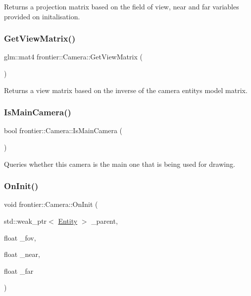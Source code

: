 Returns a projection matrix based on the field of view, near and far variables provided on initalisation. 

\mbox{\label{classfrontier_1_1_camera_ad31e39125db73f05bfb9aabbf221c8e3}} 
\subsubsection{\texorpdfstring{Get\+View\+Matrix()}{GetViewMatrix()}}
{\footnotesize\ttfamily glm\+::mat4 frontier\+::\+Camera\+::\+Get\+View\+Matrix (\begin{DoxyParamCaption}{ }\end{DoxyParamCaption})}



Returns a view matrix based on the inverse of the camera entity\textquotesingle{}s model matrix. 

\mbox{\label{classfrontier_1_1_camera_abccd21681649a9474ac1708522a4b89d}} 
\subsubsection{\texorpdfstring{Is\+Main\+Camera()}{IsMainCamera()}}
{\footnotesize\ttfamily bool frontier\+::\+Camera\+::\+Is\+Main\+Camera (\begin{DoxyParamCaption}{ }\end{DoxyParamCaption})}



Queries whether this camera is the main one that is being used for drawing. 

\mbox{\label{classfrontier_1_1_camera_a8f3aa751dc37b1167b643c6aa1923b26}} 
\subsubsection{\texorpdfstring{On\+Init()}{OnInit()}}
{\footnotesize\ttfamily void frontier\+::\+Camera\+::\+On\+Init (\begin{DoxyParamCaption}\item[{std\+::weak\+\_\+ptr$<$ \hyperlink{classfrontier_1_1_entity}{Entity} $>$}]{\+\_\+parent,  }\item[{float}]{\+\_\+fov,  }\item[{float}]{\+\_\+near,  }\item[{float}]{\+\_\+far }\end{DoxyParamCaption})}



